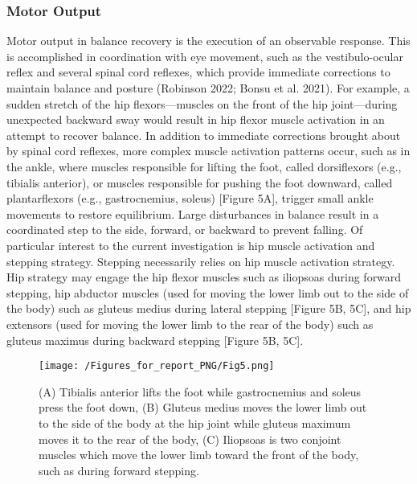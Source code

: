\documentclass[
  letterpaper,
  DIV=11,
  numbers=noendperiod]{scrartcl}
\begin{document}
\subsubsection{Motor Output}\label{motor-output}

Motor output in balance recovery is the execution of an observable
response. This is accomplished in coordination with eye movement, such
as the vestibulo-ocular reflex and several spinal cord reflexes, which
provide immediate corrections to maintain balance and posture (Robinson
2022; Bonsu et al. 2021). For example, a sudden stretch of the hip
flexors---muscles on the front of the hip joint---during unexpected
backward sway would result in hip flexor muscle activation in an attempt
to recover balance. In addition to immediate corrections brought about
by spinal cord reflexes, more complex muscle activation patterns occur,
such as in the ankle, where muscles responsible for lifting the foot,
called dorsiflexors (e.g., tibialis anterior), or muscles responsible
for pushing the foot downward, called plantarflexors (e.g.,
gastrocnemius, soleus) {[}Figure 5A{]}, trigger small ankle movements to
restore equilibrium. Large disturbances in balance result in a
coordinated step to the side, forward, or backward to prevent falling.
Of particular interest to the current investigation is hip muscle
activation and stepping strategy. Stepping necessarily relies on hip
muscle activation strategy. Hip strategy may engage the hip flexor
muscles such as iliopsoas during forward stepping, hip abductor muscles
(used for moving the lower limb out to the side of the body) such as
gluteus medius during lateral stepping {[}Figure 5B, 5C{]}, and hip
extensors (used for moving the lower limb to the rear of the body) such
as gluteus maximus during backward stepping {[}Figure 5B, 5C{]}.

\begin{figure}[H]

{\centering \texttt{[image: /Figures\_for\_report\_PNG/Fig5.png]}

}

\caption{(A) Tibialis anterior lifts the foot while gastrocnemius and
soleus press the foot down, (B) Gluteus medius moves the lower limb out
to the side of the body at the hip joint while gluteus maximum moves it
to the rear of the body, (C) Iliopsoas is two conjoint muscles which
move the lower limb toward the front of the body, such as during forward
stepping.}

\end{figure}%
\end{document}
